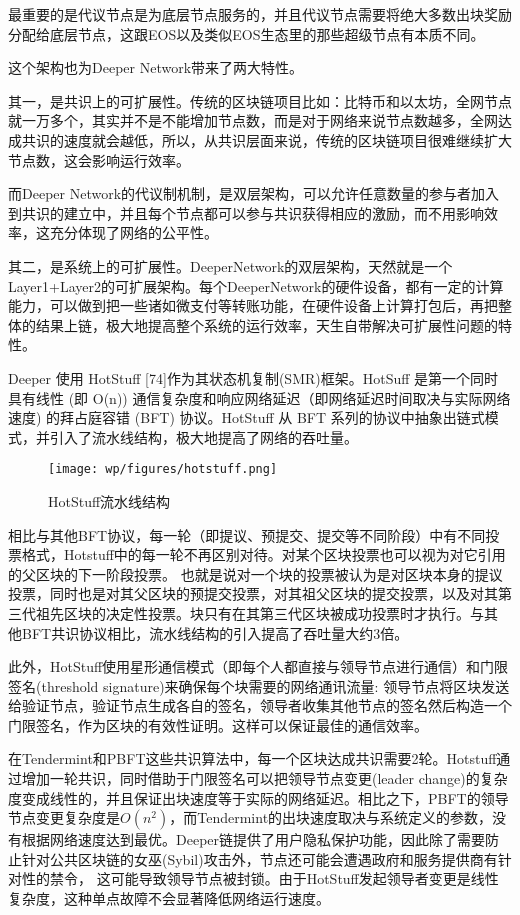 \documentclass[a4paper]{article}
\begin{document}
最重要的是代议节点是为底层节点服务的，并且代议节点需要将绝大多数出块奖励分配给底层节点，这跟EOS以及类似EOS生态里的那些超级节点有本质不同。

这个架构也为Deeper Network带来了两大特性。

其一，是共识上的可扩展性。传统的区块链项目比如：比特币和以太坊，全网节点就一万多个，其实并不是不能增加节点数，而是对于网络来说节点数越多，全网达成共识的速度就会越低，所以，从共识层面来说，传统的区块链项目很难继续扩大节点数，这会影响运行效率。

⽽Deeper Network的代议制机制，是双层架构，可以允许任意数量的参与者加入到共识的建立中，并且每个节点都可以参与共识获得相应的激励，而不用影响效率，这充分体现了网络的公平性。

其二，是系统上的可扩展性。DeeperNetwork的双层架构，天然就是一个Layer1+Layer2的可扩展架构。每个DeeperNetwork的硬件设备，都有一定的计算能力，可以做到把一些诸如微支付等转账功能，在硬件设备上计算打包后，再把整体的结果上链，极大地提高整个系统的运行效率，天生自带解决可扩展性问题的特性。


Deeper 使用 HotStuff [74]作为其状态机复制(SMR)框架。HotSuff 是第一个同时具有线性 (即 O(n)) 通信复杂度和响应网络延迟（即网络延迟时间取决与实际网络速度) 的拜占庭容错 (BFT) 协议。HotStuff 从 BFT 系列的协议中抽象出链式模式，并引入了流水线结构，极大地提高了网络的吞吐量。


\begin{figure}[hhhh]
\centering
\texttt{[image: wp/figures/hotstuff.png]}
\caption{HotStuff流水线结构}
\label{fig:hotstuff}
\end{figure}

相比与其他BFT协议，每一轮（即提议、预提交、提交等不同阶段）中有不同投票格式，Hotstuff中的每一轮不再区别对待。对某个区块投票也可以视为对它引用的父区块的下一阶段投票。 也就是说对一个块的投票被认为是对区块本身的提议投票，同时也是对其父区块的预提交投票，对其祖父区块的提交投票，以及对其第三代祖先区块的决定性投票。块只有在其第三代区块被成功投票时才执行。与其 他BFT共识协议相比，流水线结构的引入提高了吞吐量大约3倍。

此外，HotStuff使用星形通信模式（即每个人都直接与领导节点进行通信）和门限签名(threshold signature)来确保每个块需要的网络通讯流量: 领导节点将区块发送给验证节点，验证节点生成各自的签名，领导者收集其他节点的签名然后构造一个门限签名，作为区块的有效性证明。这样可以保证最佳的通信效率。

在Tendermint和PBFT这些共识算法中，每一个区块达成共识需要2轮。Hotstuff通过增加一轮共识，同时借助于门限签名可以把领导节点变更(leader change)的复杂度变成线性的，并且保证出块速度等于实际的网络延迟。相比之下，PBFT的领导节点变更复杂度是$O(n^2)$，而Tendermint的出块速度取决与系统定义的参数，没有根据网络速度达到最优。Deeper链提供了用户隐私保护功能，因此除了需要防止针对公共区块链的女巫(Sybil)攻击外，节点还可能会遭遇政府和服务提供商有针对性的禁令， 这可能导致领导节点被封锁。由于HotStuff发起领导者变更是线性复杂度，这种单点故障不会显著降低网络运行速度。
\end{document}
